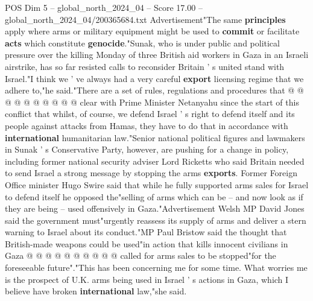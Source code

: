\begin{textsample}{POS Dim 5 – global\_north\_2024\_04 – Score 17.00 – global\_north\_2024\_04/200365684.txt}
Advertisement"The same \textbf{principles} apply where arms or military equipment might be used to \textbf{commit} or facilitate \textbf{acts} which constitute \textbf{genocide}."Sunak, who is under public and political pressure over the killing Monday of three British aid workers in Gaza in an Israeli airstrike, has so far resisted calls to reconsider Britain ' s united stand with Israel."I think we ' ve always had a very careful \textbf{export} licensing regime that we adhere to,"he said."There are a set of rules, regulations and procedures that @ @ @ @ @ @ @ @ @ @ clear with Prime Minister Netanyahu since the start of this conflict that whilst, of course, we defend Israel ' s right to defend itself and its people against attacks from Hamas, they have to do that in accordance with \textbf{international} humanitarian law."Senior national political figures and lawmakers in Sunak ' s Conservative Party, however, are pushing for a change in policy, including former national security adviser Lord Ricketts who said Britain needed to send Israel a strong message by stopping the arms \textbf{exports}.
Former Foreign Office minister Hugo Swire said that while he fully supported arms sales for Israel to defend itself he opposed the"selling of arms which can be -- and now look as if they are being -- used offensively in Gaza."Advertisement Welsh MP David Jones said the government must"urgently reassess its supply of arms and deliver a stern warning to Israel about its conduct."MP Paul Bristow said the thought that British-made weapons could be used"in action that kills innocent civilians in Gaza @ @ @ @ @ @ @ @ @ @ called for arms sales to be stopped"for the foreseeable future"."This has been concerning me for some time.
What worries me is the prospect of U.K. arms being used in Israel ' s actions in Gaza, which I believe have broken \textbf{international} law,"she said.

\end{textsample}
